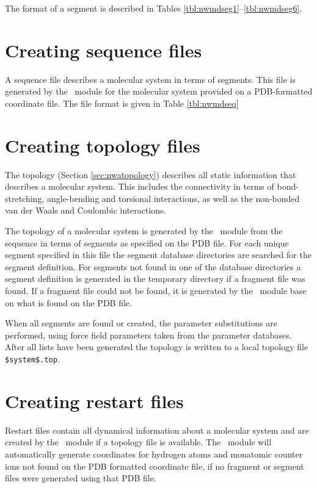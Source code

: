 The format of a segment is
described in Tables \ref{tbl:nwmdseg1}--\ref{tbl:nwmdseg6}.

\section{Creating sequence files}
A sequence file describes a molecular system in terms of segments. This
file is generated by the \prepare\ module for the molecular system
provided on a PDB-formatted coordinate file.
The file format is given in Table \ref{tbl:nwmdseq}

\section{Creating topology files}
\label{sec:nwanwtop}

The topology (Section \ref{sec:nwatopology}) describes all static information
that describes a molecular system. This includes the connectivity in
terms of bond-stretching, angle-bending and torsional interactions, as well as
the non-bonded van der Waals and Coulombic interactions.

The topology of a molecular system is generated by the \prepare\ module
from the sequence in terms of segments as specified on the PDB file.
For each unique segment specified in this file the 
segment database directories are searched for the segment definition. 
For segments not found in one of the database directories a segment definition
is generated in the temporary directory if a fragment file was found.
If a fragment file could not be found, it is generated by the \prepare\ module
base on what is found on the PDB file.

When all segments are found or created, the parameter substitutions are 
performed, using force field parameters taken from the parameter 
databases. After all lists have been generated the
topology is written to a local topology file \verb+$system$.top+.

\section{Creating restart files}
\label{sec:nwanwrst}

Restart files contain all dynamical information about a molecular
system and are created by the \prepare\ module if a topology file
is available. The \prepare\ module will automatically generate
coordinates for hydrogen atoms and monatomic counter ions
not found on the PDB formatted coordinate file, if no fragment or
segment files were generated using that PDB file.

